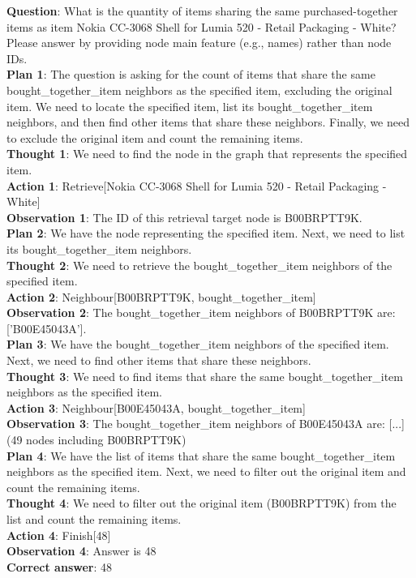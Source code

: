 \documentclass[11pt]{article}
\begin{document}
\begin{tcolorbox}[colback=white!10!white, colframe=blue!30!black, title=True Case (Amazon), boxrule=1pt, fontupper={\fontsize{7pt}{9pt}\selectfont}]
\justifying
\noindent
\raggedright
\textbf{Question}: What is the quantity of items sharing the same purchased-together items as item Nokia CC-3068 Shell for Lumia 520 - Retail Packaging - White? Please answer by providing node main feature (e.g., names) rather than node IDs. \\
\textbf{Plan 1}: The question is asking for the count of items that share the same bought\_together\_item neighbors as the specified item, excluding the original item. We need to locate the specified item, list its bought\_together\_item neighbors, and then find other items that share these neighbors. Finally, we need to exclude the original item and count the remaining items.\\
\textbf{Thought 1}: We need to find the node in the graph that represents the specified item.\\
\textbf{Action 1}: Retrieve[Nokia CC-3068 Shell for Lumia 520 - Retail Packaging - White]\\
\textbf{Observation 1}: The ID of this retrieval target node is B00BRPTT9K. \\
\textbf{Plan 2}: We have the node representing the specified item. Next, we need to list its bought\_together\_item neighbors.\\
\textbf{Thought 2}: We need to retrieve the bought\_together\_item neighbors of the specified item.\\
\textbf{Action 2}: Neighbour[B00BRPTT9K, bought\_together\_item]\\
\textbf{Observation 2}: The bought\_together\_item neighbors of B00BRPTT9K are: ['B00E45043A']. \\
\textbf{Plan 3}: We have the bought\_together\_item neighbors of the specified item. Next, we need to find other items that share these neighbors.\\
\textbf{Thought 3}: We need to find items that share the same bought\_together\_item neighbors as the specified item.\\
\textbf{Action 3}: Neighbour[B00E45043A, bought\_together\_item]\\
\textbf{Observation 3}: The bought\_together\_item neighbors of B00E45043A are: [...](49 nodes including B00BRPTT9K)\\ 
\textbf{Plan 4}: We have the list of items that share the same bought\_together\_item neighbors as the specified item. Next, we need to filter out the original item and count the remaining items.\\
\textbf{Thought 4}: We need to filter out the original item (B00BRPTT9K) from the list and count the remaining items.\\
\textbf{Action 4}: Finish[48]\\
\textbf{Observation 4}: Answer is 48\\
\textbf{Correct answer}: 48
\end{tcolorbox}
\end{document}

